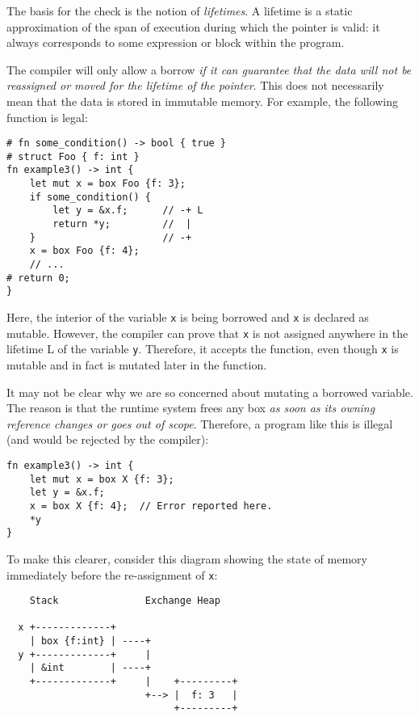 \documentclass[]{article}
\begin{document}
The basis for the check is the notion of \emph{lifetimes}. A lifetime is
a static approximation of the span of execution during which the pointer
is valid: it always corresponds to some expression or block within the
program.

The compiler will only allow a borrow \emph{if it can guarantee that the
data will not be reassigned or moved for the lifetime of the pointer}.
This does not necessarily mean that the data is stored in immutable
memory. For example, the following function is legal:

\begin{verbatim}
# fn some_condition() -> bool { true }
# struct Foo { f: int }
fn example3() -> int {
    let mut x = box Foo {f: 3};
    if some_condition() {
        let y = &x.f;      // -+ L
        return *y;         //  |
    }                      // -+
    x = box Foo {f: 4};
    // ...
# return 0;
}
\end{verbatim}

Here, the interior of the variable \texttt{x} is being borrowed and
\texttt{x} is declared as mutable. However, the compiler can prove that
\texttt{x} is not assigned anywhere in the lifetime L of the variable
\texttt{y}. Therefore, it accepts the function, even though \texttt{x}
is mutable and in fact is mutated later in the function.

It may not be clear why we are so concerned about mutating a borrowed
variable. The reason is that the runtime system frees any box \emph{as
soon as its owning reference changes or goes out of scope}. Therefore, a
program like this is illegal (and would be rejected by the compiler):

\begin{verbatim}
fn example3() -> int {
    let mut x = box X {f: 3};
    let y = &x.f;
    x = box X {f: 4};  // Error reported here.
    *y
}
\end{verbatim}

To make this clearer, consider this diagram showing the state of memory
immediately before the re-assignment of \texttt{x}:

\begin{verbatim}
    Stack               Exchange Heap

  x +-------------+
    | box {f:int} | ----+
  y +-------------+     |
    | &int        | ----+
    +-------------+     |    +---------+
                        +--> |  f: 3   |
                             +---------+
\end{verbatim}
\end{document}
